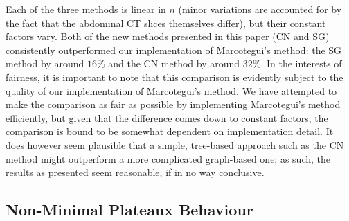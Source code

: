 \documentclass[preprint,a4paper]{elsarticle}
\begin{document}
Each of the three methods is linear in $n$ (minor variations are accounted for by the fact that the abdominal CT slices themselves differ), but their constant factors vary. Both of the new methods presented in this paper (CN and SG) consistently outperformed our implementation of Marcotegui's method: the SG method by around $16$\% and the CN method by around $32$\%. In the interests of fairness, it is important to note that this comparison is evidently subject to the quality of our implementation of Marcotegui's method. We have attempted to make the comparison as fair as possible by implementing Marcotegui's method efficiently, but given that the difference comes down to constant factors, the comparison is bound to be somewhat dependent on implementation detail. It does however seem plausible that a simple, tree-based approach such as the CN method might outperform a more complicated graph-based one; as such, the results as presented seem reasonable, if in no way conclusive.


\subsection{Non-Minimal Plateaux Behaviour}
\label{subsec:experiments-plateaux}
\end{document}

